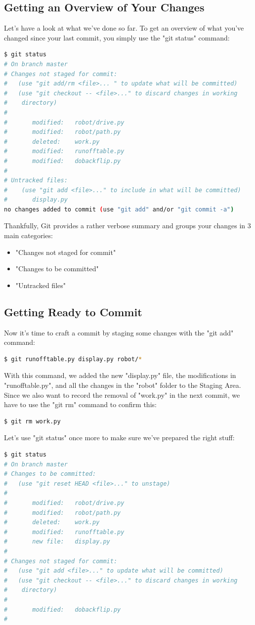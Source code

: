 \documentclass{article}
\begin{document}
\subsection{Getting an Overview of Your Changes}
Let's have a look at what we've done so far. To get an overview of what you've changed since your last commit, you simply use the "git status" command:
\begin{lstlisting}[language=bash]
$ git status
# On branch master
# Changes not staged for commit:
#   (use "git add/rm <file>... " to update what will be committed)
#   (use "git checkout -- <file>..." to discard changes in working
#    directory)
#
#       modified:   robot/drive.py
#       modified:   robot/path.py
#       deleted:    work.py
#       modified:   runofftable.py
#       modified:   dobackflip.py
#
# Untracked files:
#    (use "git add <file>..." to include in what will be committed)
#       display.py
no changes added to commit (use "git add" and/or "git commit -a")
\end{lstlisting}
Thankfully, Git provides a rather verbose summary and groups your changes in 3 main categories:
\begin{itemize}
    \item "Changes not staged for commit"
    \item "Changes to be committed"
    \item "Untracked files"
\end{itemize}
\subsection{Getting Ready to Commit}
Now it's time to craft a commit by staging some changes with the "git add" command:
\begin{lstlisting}[language=bash]
$ git runofftable.py display.py robot/*
\end{lstlisting}
With this command, we added the new "display.py" file, the modifications in "runofftable.py", and all the changes in the "robot" folder to the Staging Area. Since we also want to record the removal of "work.py" in the next commit, we have to use the "git rm" command to confirm this:
\begin{lstlisting}[language=bash]
$ git rm work.py
\end{lstlisting}
Let's use "git status" once more to make sure we've prepared the right stuff:
\begin{lstlisting}[language=bash]
$ git status
# On branch master
# Changes to be committed:
#   (use "git reset HEAD <file>..." to unstage)
#
#       modified:   robot/drive.py
#       modified:   robot/path.py
#       deleted:    work.py
#       modified:   runofftable.py
#       new file:   display.py
#
# Changes not staged for commit:
#   (use "git add <file>..." to update what will be committed)
#   (use "git checkout -- <file>..." to discard changes in working 
#    directory)
#
#       modified:   dobackflip.py
#
\end{lstlisting}
\end{document}
